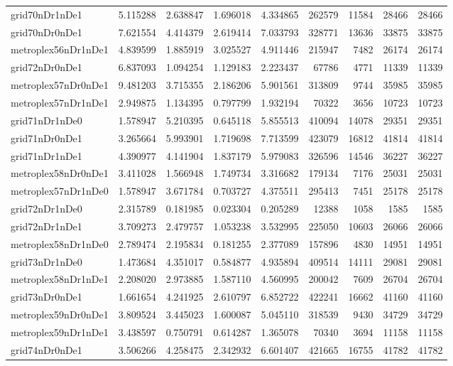 \begin{longtable}{|l|r|r|r|r|r|r|r|r|}
grid70nDr1nDe1 & 5.115288 & 2.638847 & 1.696018 & 4.334865 & 262579 & 11584 & 28466 & 28466 \\
grid70nDr0nDe1 & 7.621554 & 4.414379 & 2.619414 & 7.033793 & 328771 & 13636 & 33875 & 33875 \\
metroplex56nDr1nDe1 & 4.839599 & 1.885919 & 3.025527 & 4.911446 & 215947 & 7482 & 26174 & 26174 \\
grid72nDr0nDe1 & 6.837093 & 1.094254 & 1.129183 & 2.223437 & 67786 & 4771 & 11339 & 11339 \\
metroplex57nDr0nDe1 & 9.481203 & 3.715355 & 2.186206 & 5.901561 & 313809 & 9744 & 35985 & 35985 \\
metroplex57nDr1nDe1 & 2.949875 & 1.134395 & 0.797799 & 1.932194 & 70322 & 3656 & 10723 & 10723 \\
grid71nDr1nDe0 & 1.578947 & 5.210395 & 0.645118 & 5.855513 & 410094 & 14078 & 29351 & 29351 \\
grid71nDr0nDe1 & 3.265664 & 5.993901 & 1.719698 & 7.713599 & 423079 & 16812 & 41814 & 41814 \\
grid71nDr1nDe1 & 4.390977 & 4.141904 & 1.837179 & 5.979083 & 326596 & 14546 & 36227 & 36227 \\
metroplex58nDr0nDe1 & 3.411028 & 1.566948 & 1.749734 & 3.316682 & 179134 & 7176 & 25031 & 25031 \\
metroplex57nDr1nDe0 & 1.578947 & 3.671784 & 0.703727 & 4.375511 & 295413 & 7451 & 25178 & 25178 \\
grid72nDr1nDe0 & 2.315789 & 0.181985 & 0.023304 & 0.205289 & 12388 & 1058 & 1585 & 1585 \\
grid72nDr1nDe1 & 3.709273 & 2.479757 & 1.053238 & 3.532995 & 225050 & 10603 & 26066 & 26066 \\
metroplex58nDr1nDe0 & 2.789474 & 2.195834 & 0.181255 & 2.377089 & 157896 & 4830 & 14951 & 14951 \\
grid73nDr1nDe0 & 1.473684 & 4.351017 & 0.584877 & 4.935894 & 409514 & 14111 & 29081 & 29081 \\
metroplex58nDr1nDe1 & 2.208020 & 2.973885 & 1.587110 & 4.560995 & 200042 & 7609 & 26704 & 26704 \\
grid73nDr0nDe1 & 1.661654 & 4.241925 & 2.610797 & 6.852722 & 422241 & 16662 & 41160 & 41160 \\
metroplex59nDr0nDe1 & 3.809524 & 3.445023 & 1.600087 & 5.045110 & 318539 & 9430 & 34729 & 34729 \\
metroplex59nDr1nDe1 & 3.438597 & 0.750791 & 0.614287 & 1.365078 & 70340 & 3694 & 11158 & 11158 \\
grid74nDr0nDe1 & 3.506266 & 4.258475 & 2.342932 & 6.601407 & 421665 & 16755 & 41782 & 41782 \\

\end{longtable}
